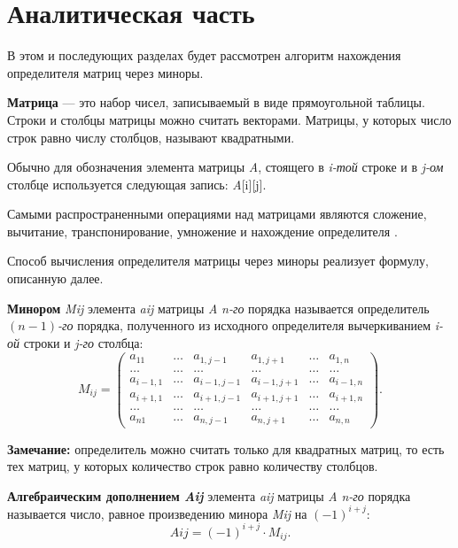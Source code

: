 \chapter{Аналитическая часть}
В этом и последующих разделах будет рассмотрен алгоритм нахождения определителя матриц через миноры.

\textbf{Матрица} \cite{matrix} — это набор чисел, записываемый в виде прямоугольной таблицы. Строки и столбцы матрицы можно считать векторами. Матрицы, у которых число строк равно числу столбцов, называют квадратными.

Обычно для обозначения элемента матрицы \textit{A}, стоящего в \textit{i-той} строке и в \textit{j-ом} столбце используется следующая запись: \textit{A}[i][j].

Самыми распространенными операциями над матрицами являются сложение, вычитание, транспонирование, умножение и нахождение определителя \cite{matrix}.

Способ вычисления определителя матрицы через миноры реализует формулу, описанную далее. 

\textbf{Минором} \textit{Mij} элемента \textit{aij} матрицы \textit{A} \textit{n}\textit{-го} порядка называется определитель $(n-1)$\textit{-го} порядка, полученного из исходного определителя вычеркиванием \textit{i}\textit{-ой} строки и \textit{j}\textit{-го} столбца:
\begin{equation}
	M_{ij} = \begin{pmatrix}
		a_{11} & \ldots & a_{1,j-1} & a_{1,j+1} & \ldots & a_{1,n}\\
		\ldots & \ldots & \ldots & \ldots & \ldots & \ldots\\
		a_{i-1,1} & \ldots & a_{i-1,j-1} & a_{i-1,j+1} & \ldots & a_{i-1,n}\\
		a_{i+1,1} & \ldots & a_{i+1,j-1} & a_{i+1,j+1} & \ldots & a_{i+1,n}\\
		\ldots & \ldots & \ldots & \ldots & \ldots & \ldots\\
		a_{n1} & \ldots & a_{n,j-1} & a_{n,j+1} & \ldots & a_{n,n}
	\end{pmatrix}.
\end{equation}

\textbf{Замечание:} определитель можно считать только для квадратных матриц, то есть тех матриц, у которых количество строк равно количеству столбцов.

\textbf{Алгебраическим дополнением \textit{Aij}} элемента \textit{aij} матрицы \textit{A} \textit{n}\textit{-го} порядка называется число, равное произведению минора \textit{Mij} на $(−1)^{i+j}$: 
\begin{equation}
 Aij=(−1)^{i+j}\cdot M_{ij}.
\end{equation}


